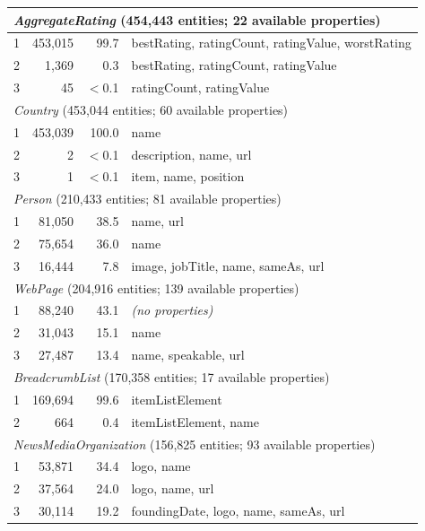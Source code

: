 \documentclass[11pt,a4paper]{article}
\begin{document}
\begin{longtable}{rrrp{9cm}}
%
\multicolumn{4}{l}{\textit{AggregateRating} (454{,}443 entities; 22 available properties)} \\
\midrule
1 & 453{,}015 & 99.7 & \scriptsize bestRating, ratingCount, ratingValue, worstRating \\[2pt]
2 &   1{,}369 &  0.3 & \scriptsize bestRating, ratingCount, ratingValue \\[2pt]
3 &        45 & $<$0.1 & \scriptsize ratingCount, ratingValue \\[4pt]
%
\multicolumn{4}{l}{\textit{Country} (453{,}044 entities; 60 available properties)} \\
\midrule
1 & 453{,}039 & 100.0 & \scriptsize name \\[2pt]
2 &         2 & $<$0.1 & \scriptsize description, name, url \\[2pt]
3 &         1 & $<$0.1 & \scriptsize item, name, position \\[4pt]
%
\multicolumn{4}{l}{\textit{Person} (210{,}433 entities; 81 available properties)} \\
\midrule
1 &  81{,}050 & 38.5 & \scriptsize name, url \\[2pt]
2 &  75{,}654 & 36.0 & \scriptsize name \\[2pt]
3 &  16{,}444 &  7.8 & \scriptsize image, jobTitle, name, sameAs, url \\[4pt]
%
\multicolumn{4}{l}{\textit{WebPage} (204{,}916 entities; 139 available properties)} \\
\midrule
1 &  88{,}240 & 43.1 & \scriptsize \textit{(no properties)} \\[2pt]
2 &  31{,}043 & 15.1 & \scriptsize name \\[2pt]
3 &  27{,}487 & 13.4 & \scriptsize name, speakable, url \\[4pt]
%
\multicolumn{4}{l}{\textit{BreadcrumbList} (170{,}358 entities; 17 available properties)} \\
\midrule
1 & 169{,}694 & 99.6 & \scriptsize itemListElement \\[2pt]
2 &       664 &  0.4 & \scriptsize itemListElement, name \\[4pt]
%
\multicolumn{4}{l}{\textit{NewsMediaOrganization} (156{,}825 entities; 93 available properties)} \\
\midrule
1 &  53{,}871 & 34.4 & \scriptsize logo, name \\[2pt]
2 &  37{,}564 & 24.0 & \scriptsize logo, name, url \\[2pt]
3 &  30{,}114 & 19.2 & \scriptsize foundingDate, logo, name, sameAs, url \\[4pt]

\end{longtable}
\end{document}
